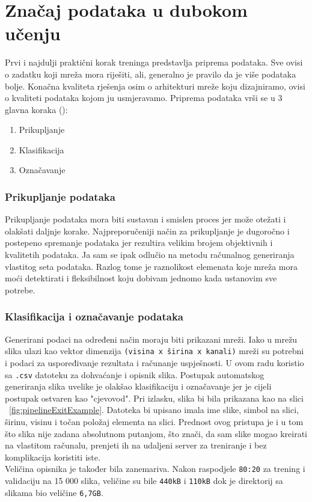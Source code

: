 \section{Značaj podataka u dubokom učenju}
Prvi i najdulji praktični korak treninga predstavlja priprema podataka. 
Sve ovisi o zadatku koji mreža mora riješiti, ali, generalno je pravilo da je više podataka bolje.
Konačna kvaliteta rješenja osim o arhitekturi mreže koju dizajniramo, ovisi o kvaliteti podataka kojom ju usmjeravamo.
Priprema podataka vrši se u 3 glavna koraka (\cite{generalDatasets}):
\begin{enumerate}
\item Prikupljanje
\item Klasifikacija
\item Označavanje
\end{enumerate} 
\subsubsection{Prikupljanje podataka}
Prikupljanje podataka mora biti sustavan i smislen proces jer može otežati i olakšati daljnje korake. 
Najpreporučeniji način za prikupljanje je dugoročno i postepeno spremanje podataka jer rezultira velikim brojem objektivnih i kvalitetih podataka.
Ja sam se ipak odlučio na metodu računalnog generiranja vlastitog seta podataka. 
Razlog tome je raznolikost elemenata koje mreža mora moći detektirati i fleksibilnost koju dobivam jednomo kada ustanovim sve potrebe.
\subsubsection{Klasifikacija i označavanje podataka}
Generirani podaci na određeni način moraju biti prikazani mreži. 
Iako u mrežu slika ulazi kao vektor dimenzija \texttt{(visina x širina x kanali)} mreži su potrebni i podaci za uspoređivanje rezultata i računanje uspješnosti.
U ovom radu koristio sa \texttt{.csv} datoteku za dohvaćanje i opisnik slika. 
Postupak automatskog generiranja slika uvelike je olakšao klasifikaciju i označavanje jer je cijeli postupak ostvaren kao "cjevovod".
Pri izlasku, slika bi bila prikazana kao na slici ~\ref{fig:pipelineExitExample}.
Datoteka bi upisano imala ime slike, simbol na slici, širinu, visinu i točan položaj elementa na slici. 
Prednost ovog pristupa je i u tom što slika nije zadana absolutnom putanjom, što znači, da sam slike mogao kreirati na vlastitom računalu, prenjeti ih na udaljeni server za treniranje i bez komplikacija koristiti iste. \\
Veličina opisnika je također bila zanemariva. 
Nakon raspodjele \texttt{80:20} za trening i validaciju na 15 000 slika, veličine su bile \texttt{440kB} i \texttt{110kB} dok je direktorij sa slikama bio veličine \texttt{6,7GB}.


